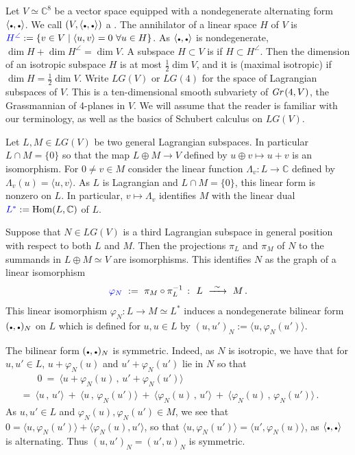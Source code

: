 \documentclass[12pt]{amsart}
\theoremstyle{remark}
\newcommand{\Hom}{\textrm{Hom}}
\newcommand{\Gr}{\textit{Gr\,}}
\newcommand{\LG}{\textit{LG}}
\newcommand{\CC}{{\mathbb C}}
\newcommand{\ndot}{\mbox{{\tiny$\bullet$}}}
\newcommand{\defcolor}[1]{{\color{blue}#1}}
\newcommand{\demph}[1]{\defcolor{{\sl #1}}}
\begin{document}
Let $V\simeq\CC^8$ be a vector space equipped with a nondegenerate alternating form \defcolor{$\langle\ndot,\ndot\rangle$}.
We call $(V,\langle\ndot,\ndot\rangle)$ a \demph{symplectic vector space}.
The annihilator of a linear space $H$ of $V$ is $ \defcolor{H^{\angle}}:= \{v\in V\mid \langle u,v\rangle = 0\ \forall u\in H\}$.
As $\langle\ndot,\ndot\rangle$ is nondegenerate, $\dim H + \dim H^\angle=\dim V$.
A subspace $H\subset V$ is \demph{isotropic} if $H\subset H^{\angle}$.
Then the dimension of an isotropic subspace $H$ is at most $\frac{1}{2}\dim V$, and it is  \demph{Lagrangian} (maximal isotropic) if
$\dim H = \frac{1}{2}\dim V$.
Write \defcolor{$\LG(V)$} or \defcolor{$\LG(4)$} for the space of Lagrangian subspaces of $V$.
This is a ten-dimensional smooth subvariety of \defcolor{$\Gr(4,V)$}, the Grassmannian of 4-planes in $V$.
We will assume that the reader is familiar with our terminology, as well as the basics of Schubert calculus on $\LG(V)$.

Let $L,M\in\LG(V)$ be two general Lagrangian subspaces.
In particular $L\cap M=\{0\}$ so that the map $L\oplus M\to V$ defined by $u\oplus v\mapsto u+v$ is an isomorphism.
For $0\neq v\in M$ consider the linear function $\Lambda_v\colon L\to \CC$ defined by $\Lambda_v(u)=\langle u,v\rangle$.
As $L$ is Lagrangian and $L\cap M=\{0\}$, this linear form is nonzero on $L$.
In particular, $v\mapsto \Lambda_v$ identifies $M$ with the linear dual $\defcolor{L^*}:=\Hom(L,\CC)$ of $L$.

Suppose that $N\in\LG(V)$ is a third Lagrangian subspace in general position with respect to both $L$ and $M$.
Then the projections  \defcolor{$\pi_L$} and \defcolor{$\pi_M$} of $N$ to the summands in $L\oplus M\simeq V$ are isomorphisms.
This identifies $N$ as the graph of a linear isomorphism
\[
\defcolor{\varphi_N}\ :=\ \pi_M\circ\pi_L^{-1}\ \colon\ L\ \xrightarrow{\ \sim\ }\  M\,.
\]
This linear isomorphism $\varphi_N\colon L\to M\simeq L^*$  induces a nondegenerate bilinear form \defcolor{$(\ndot,\ndot)_N$} on $L$ which
is defined for $u,u\in L$ by $(u,u')_N:=\langle u, \varphi_N(u')\rangle$.

The bilinear form $(\ndot,\ndot)_N$ is symmetric.
Indeed, as $N$ is isotropic, we have that for $u,u'\in L$, $u+\varphi_N(u)$ and $u'+\varphi_N(u')$ lie in $N$ so that
%
 \begin{multline*}
   \qquad 0\ =\  \langle u+\varphi_N(u)\,,\, u'+\varphi_N(u')\rangle
   \\
    \ =\
    \langle u\,,\,u' \rangle \ +\ 
    \langle u\,,\,\varphi_N(u') \rangle  \ +\ 
    \langle \varphi_N(u)\,,\,u' \rangle \ +\ 
    \langle \varphi_N(u)\,,\,\varphi_N(u') \rangle\,. \qquad
 \end{multline*}
%
As $u,u'\in L$ and $\varphi_N(u),\varphi_N(u')\in M$, we see that $0 = \langle u,\varphi_N(u') \rangle   + \langle \varphi_N(u),u' \rangle$, 
so that $\langle u,\varphi_N(u') \rangle =\langle u',\varphi_N(u) \rangle$, as $\langle\ndot,\ndot\rangle$ is alternating.
Thus $(u,u')_N=(u',u)_N$  is symmetric.
\end{document}
